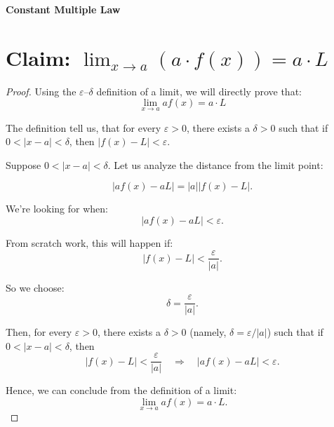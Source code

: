 \documentclass{article}
\begin{document}
	
\textbf{Constant Multiple Law}
	
\section*{Claim: $\lim_{x \to a} \left( a \cdot f(x) \right) = a \cdot L$}


\begin{proof}


Using the $\varepsilon$–$\delta$ definition of a limit, we will directly prove that:
\[
\lim_{x \to a} af(x) = a \cdot L
\]

\bigskip

The definition tell us, that for every $\varepsilon > 0$, there exists a $\delta > 0$ such that if $0 < |x - a| < \delta$, then $|f(x) - L| < \varepsilon$.

\bigskip

Suppose $0 < |x - a| < \delta$. Let us analyze the distance from the limit point:

\[
|af(x) - aL| = |a||f(x) - L|.
\]


We're looking for when:
\[
|af(x) - aL| < \varepsilon.
\]

From scratch work, this will happen if:
\[
|f(x) - L| < \frac{\varepsilon}{|a|}.
\]

\bigskip

So we choose:
\[
\delta = \frac{\varepsilon}{|a|}.
\]

\bigskip

Then, for every $\varepsilon > 0$, there exists a $\delta > 0$ (namely, $\delta = \varepsilon/|a|$) such that if $0 < |x - a| < \delta$, then
\[
|f(x) - L| < \frac{\varepsilon}{|a|} \quad \Rightarrow \quad |af(x) - aL| < \varepsilon.
\]

\bigskip

Hence, we can conclude from the definition of a limit:
\[
\lim_{x \to a} af(x) = a \cdot L.
\]





\end{proof}
\end{document}
